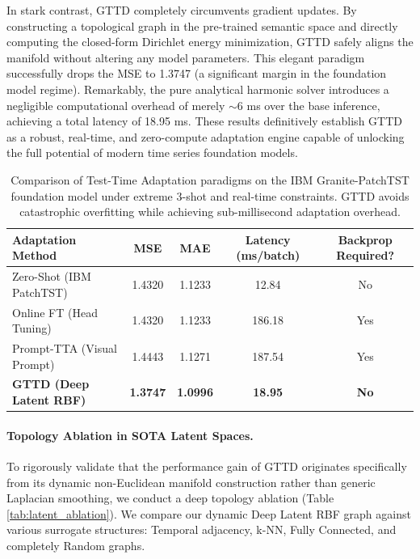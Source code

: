 \documentclass{article}
\begin{document}
In stark contrast, GTTD completely circumvents gradient updates. By constructing a topological graph in the pre-trained semantic space and directly computing the closed-form Dirichlet energy minimization, GTTD safely aligns the manifold without altering any model parameters. This elegant paradigm successfully drops the MSE to 1.3747 (a significant margin in the foundation model regime). Remarkably, the pure analytical harmonic solver introduces a negligible computational overhead of merely $\sim$6 ms over the base inference, achieving a total latency of 18.95 ms. These results definitively establish GTTD as a robust, real-time, and zero-compute adaptation engine capable of unlocking the full potential of modern time series foundation models.

\begin{table}[htbp]
\centering
\caption{Comparison of Test-Time Adaptation paradigms on the IBM Granite-PatchTST foundation model under extreme 3-shot and real-time constraints. GTTD avoids catastrophic overfitting while achieving sub-millisecond adaptation overhead.}
\label{tab:fm_tta}
\begin{tabular}{lcccc}
\toprule
\textbf{Adaptation Method} & \textbf{MSE} & \textbf{MAE} & \textbf{Latency (ms/batch)} & \textbf{Backprop Required?} \\
\midrule
Zero-Shot (IBM PatchTST) & 1.4320 & 1.1233 & 12.84 & No \\
Online FT (Head Tuning) & 1.4320 & 1.1233 & 186.18 & Yes \\
Prompt-TTA (Visual Prompt) & 1.4443 & 1.1271 & 187.54 & Yes \\
\midrule
\textbf{GTTD (Deep Latent RBF)} & \textbf{1.3747} & \textbf{1.0996} & \textbf{18.95} & \textbf{No} \\
\bottomrule
\end{tabular}
\end{table}

\paragraph{Topology Ablation in SOTA Latent Spaces.} To rigorously validate that the performance gain of GTTD originates specifically from its dynamic non-Euclidean manifold construction rather than generic Laplacian smoothing, we conduct a deep topology ablation (Table \ref{tab:latent_ablation}). We compare our dynamic Deep Latent RBF graph against various surrogate structures: Temporal adjacency, k-NN, Fully Connected, and completely Random graphs.
\end{document}
